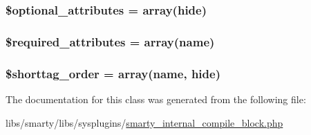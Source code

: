 \subsubsection[{\$optional\+\_\+attributes}]{\setlength{\rightskip}{0pt plus 5cm}\$optional\+\_\+attributes = array(\textquotesingle{}hide\textquotesingle{})}\label{class_smarty___internal___compile___block_a899d1eb4a6fecbd6ce696adb171c80a4}
\hypertarget{class_smarty___internal___compile___block_ae799507d5461de485f3a618abeecea95}{}
\subsubsection[{\$required\+\_\+attributes}]{\setlength{\rightskip}{0pt plus 5cm}\$required\+\_\+attributes = array(\textquotesingle{}name\textquotesingle{})}\label{class_smarty___internal___compile___block_ae799507d5461de485f3a618abeecea95}
\hypertarget{class_smarty___internal___compile___block_a2ccb25269c3a92e8c4796c7ef23725e6}{}
\subsubsection[{\$shorttag\+\_\+order}]{\setlength{\rightskip}{0pt plus 5cm}\$shorttag\+\_\+order = array(\textquotesingle{}name\textquotesingle{}, \textquotesingle{}hide\textquotesingle{})}\label{class_smarty___internal___compile___block_a2ccb25269c3a92e8c4796c7ef23725e6}


The documentation for this class was generated from the following file\+:\begin{DoxyCompactItemize}
\item 
libs/smarty/libs/sysplugins/\hyperlink{smarty__internal__compile__block_8php}{smarty\+\_\+internal\+\_\+compile\+\_\+block.\+php}\end{DoxyCompactItemize}
